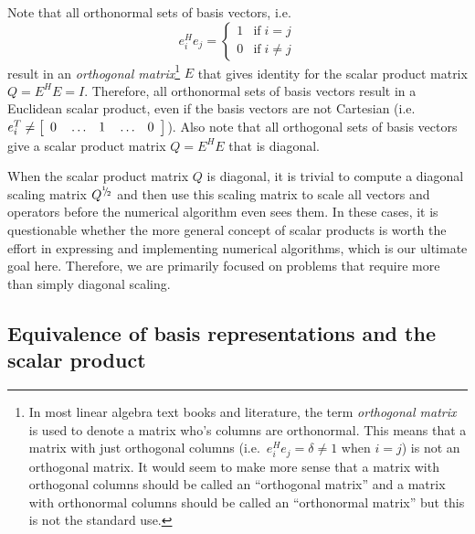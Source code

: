\documentclass[pdf,ps2pdf,11pt]{SANDreport}
\begin{document}
Note that all orthonormal sets of basis vectors, i.e.
\[
e_i^H e_j = \left\{ \begin{array}{ll} 1 & \mbox{if} \; i = j \\ 0 & \mbox{if} \; i \ne j \end{array}  \right.
\]
result in an \textit{orthogonal matrix}\footnote{
%
In most linear algebra text books and
literature, the term {}\textit{orthogonal matrix} is used to denote a matrix
who's columns are orthonormal.  This means that a matrix with just orthogonal
columns (i.e.\ $e_i^H e_j = \delta \ne 1$ when $i=j$) is not an orthogonal
matrix.  It would seem to make more sense that a matrix with orthogonal
columns should be called an ``orthogonal matrix'' and a matrix with
orthonormal columns should be called an ``orthonormal matrix'' but this is not
the standard use.
%
} $E$ that gives identity for the scalar product matrix $Q = E^H E = I$.
Therefore, all orthonormal sets of basis vectors result in a Euclidean scalar
product, even if the basis vectors are not Cartesian (i.e.\ $e_i^T {}\ne
{\bmat{ccccc} 0 & {}\ldots & 1 & {}\ldots & 0 {}\emat}$). Also note that all
orthogonal sets of basis vectors give a scalar product matrix $Q = E^H E$ that
is diagonal.

When the scalar product matrix $Q$ is diagonal, it is trivial to compute a
diagonal scaling matrix $Q^{\myonehalf}$ and then use this scaling matrix to
scale all vectors and operators before the numerical algorithm even sees them.
In these cases, it is questionable whether the more general concept of scalar
products is worth the effort in expressing and implementing numerical
algorithms, which is our ultimate goal here.  Therefore, we are primarily
focused on problems that require more than simply diagonal scaling.

\subsection{Equivalence of basis representations and the scalar product}
\end{document}
